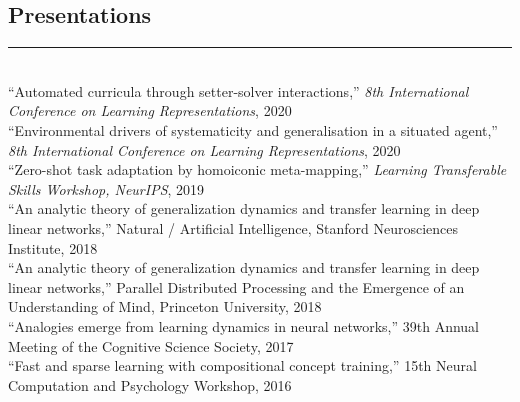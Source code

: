 \documentclass[margin]{res}
\begin{document}
\begin{resume}
\vspace{1pt}\section{Presentations} \vspace{-15pt} \rule{\textwidth}{0.5pt} \\[3pt]
{``Automated curricula through setter-solver interactions,''} \textit{8th International Conference on Learning Representations}, 2020 \\[3pt]
{``Environmental drivers of systematicity and generalisation in a situated agent,''} \textit{8th International Conference on Learning Representations}, 2020 \\[3pt]
{``Zero-shot task adaptation by homoiconic meta-mapping,''} \textit{Learning Transferable Skills Workshop, NeurIPS}, 2019 \\ [3pt] 
{``An analytic theory of generalization dynamics and transfer learning in deep linear networks,''} Natural / Artificial Intelligence, Stanford Neurosciences Institute, 2018\\[3pt]
{``An analytic theory of generalization dynamics and transfer learning in deep linear networks,''} Parallel Distributed Processing and the Emergence of an Understanding of Mind, Princeton University, 2018\\[3pt]
{``Analogies emerge from learning dynamics in neural networks,''} 39th Annual Meeting of the Cognitive Science Society, 2017\\[3pt]
{``Fast and sparse learning with compositional concept training,''} 15th Neural Computation and Psychology Workshop, 2016%


\end{resume}
\end{document}
